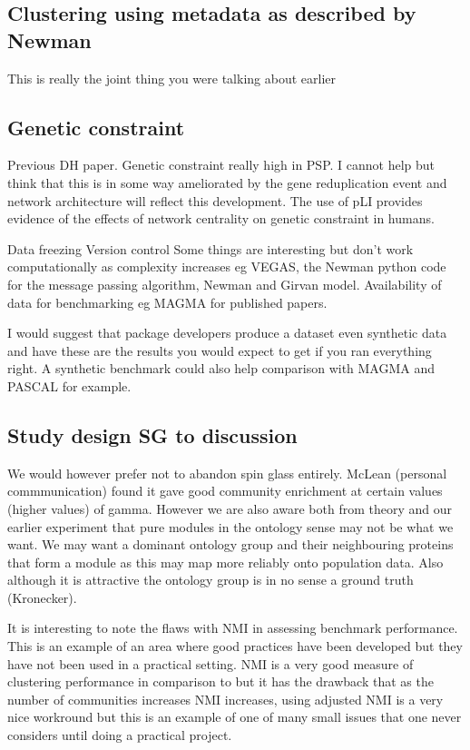  \subsection{Clustering using metadata as described by Newman}
 This is really the joint thing you were talking about earlier 
 \subsection{Genetic constraint}
 Previous DH paper. Genetic constraint really high in PSP. I cannot help but think that this is in some way ameliorated by the gene reduplication event and network architecture will reflect this development. The use of pLI provides evidence of the effects of network centrality on genetic constraint in humans.



Data freezing
 Version control 
 Some things are interesting but don't work computationally as complexity increases eg VEGAS, the Newman python code for the message passing algorithm, Newman and Girvan model. 
 Availability of data for benchmarking eg MAGMA for published papers. 
 
 I would suggest that package developers produce a dataset even synthetic data and have these are the results you would expect to get if you ran everything right. A synthetic benchmark could also help comparison with MAGMA and PASCAL for example. 
 
  \subsection{Study design SG to discussion}
We would however prefer not to abandon spin glass entirely. McLean (personal commmunication) found it gave good community enrichment at certain values (higher values) of gamma. However we are also aware both from theory and our earlier experiment that pure modules in the ontology sense may not be what we want. We may want a dominant ontology group and their neighbouring proteins that form a module as this may map more reliably onto population data. Also although it is attractive the ontology group is in no sense a ground truth  (Kronecker).



It is interesting to note the flaws with NMI in assessing benchmark performance. This is an example of an area where good practices have been developed but they have not been used in a practical setting. NMI is a very good measure of clustering performance in comparison to \cite{newman2018networks} but it has the drawback that as the number of communities increases NMI increases, using adjusted NMI is a very nice workround but this is an example of one of many small issues that one never considers until doing a practical project. 

